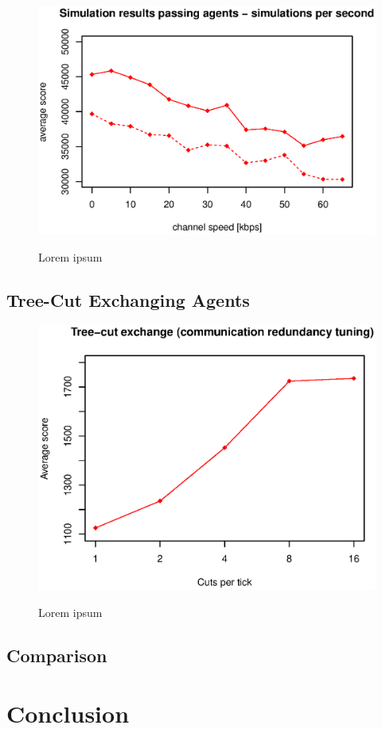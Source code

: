 \begin{figure}
\begin{center}
\includegraphics{img/simulation-passing-sims-per-sec.eps}
\end{center}
\caption{\footnotesize Lorem ipsum}{\footnotesize }
\label{fig_simulation_passing_sims_per_sec}
\end{figure}

\subsection{Tree-Cut Exchanging Agents}

\begin{figure}
\begin{center}
\includegraphics{img/tree-cut-tuning.eps}
\end{center}
\caption{\footnotesize Lorem ipsum}{\footnotesize }
\label{fig_tree_cut_tuning}
\end{figure}

\subsection{Comparison}

\section{Conclusion}
